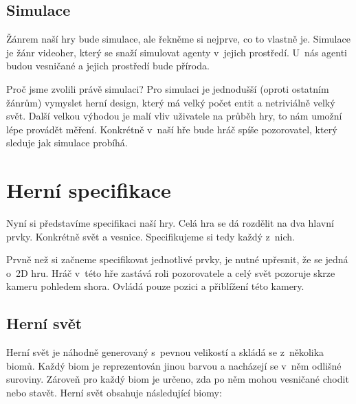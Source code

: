 
\subsection{Simulace}
Žánrem naší hry bude simulace, ale řekněme si nejprve, co to vlastně je. Simulace je žánr videoher, který se snaží simulovat agenty v~jejich prostředí. U~nás agenti budou vesničané a jejich prostředí bude příroda.

Proč jsme zvolili právě simulaci? Pro simulaci je jednodušší (oproti ostatním žánrům) vymyslet herní design, který má velký počet entit a netriviálně velký svět. Další velkou výhodou je malí vliv uživatele na průběh hry, to nám umožní lépe provádět měření. Konkrétně v~naší hře bude hráč spíše pozorovatel, který sleduje jak simulace probíhá.


\section{Herní specifikace}
\label{sec:game-spec}
Nyní si představíme specifikaci naší hry. Celá hra se dá rozdělit na dva hlavní prvky. Konkrétně svět a vesnice. Specifikujeme si tedy každý z~nich.

Prvně než si začneme specifikovat jednotlivé prvky, je nutné upřesnit, že se jedná o~2D hru. Hráč v~této hře zastává roli pozorovatele a celý svět pozoruje skrze kameru pohledem shora. Ovládá pouze pozici a přiblížení této kamery.

\subsection{Herní svět}
\label{sec:game-world}
Herní svět je náhodně generovaný s~pevnou velikostí a skládá se z~několika biomů. Každý biom je reprezentován jinou barvou a nacházejí se v~něm odlišné suroviny. Zároveň pro každý biom je určeno, zda po něm mohou vesničané chodit nebo stavět. Herní svět obsahuje následující biomy:

